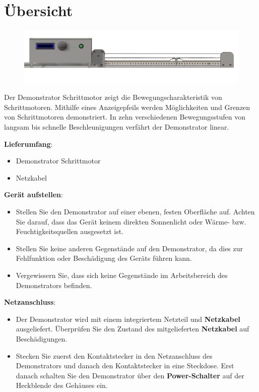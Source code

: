 %
%
%



\chapter{Übersicht}

\begin{figure}[htb]
	\begin{center}
		
			\includegraphics[width=\textwidth]{Images/Konstruktion1.png}
	\end{center}
\end{figure}


Der Demonstrator Schrittmotor zeigt die Bewegungscharakteristik von Schrittmotoren. Mithilfe eines Anzeigepfeils werden Möglichkeiten und Grenzen von Schrittmotoren demonstriert. In zehn verschiedenen Bewegungsstufen von langsam bis schnelle Beschleunigungen verfährt der Demonstrator linear. 

\newpage
\textbf{Lieferumfang}: 
\begin{itemize}
\item Demonstrator Schrittmotor	
\item Netzkabel
	\end{itemize} 	
	\bigskip
	\textbf{Gerät aufstellen}: 
	\begin{itemize}
	\item Stellen Sie den Demonstrator auf einer ebenen, festen Oberfläche auf. Achten Sie darauf, dass das Gerät keinem direkten Sonnenlicht oder Wärme- bzw. Feuchtigkeitsquellen ausgesetzt ist. 
	\item Stellen Sie keine anderen Gegenstände auf den Demonstrator, da dies zur Fehlfunktion oder Beschädigung des Geräts führen kann. 
	\item Vergewissern Sie, dass sich keine Gegenstände im Arbeitsbereich des Demonstrators befinden.
	\end{itemize}
	\textbf{Netzanschluss}:
	\begin{itemize}
		\item Der Demonstrator wird mit einem integriertem Netzteil und \textbf{Netzkabel} ausgeliefert. Überprüfen Sie den Zustand des mitgelieferten \textbf{Netzkabel} auf Beschädigungen.
		\item Stecken Sie zuerst den Kontaktstecker in den Netzanschluss des Demonstrators und danach den Kontaktstecker in eine Steckdose. Erst danach schalten Sie den Demonstrator über den \textbf{Power-Schalter} auf der Heckblende des Gehäuses ein. 
	\end{itemize} 



